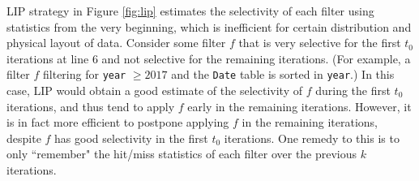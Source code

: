 \documentclass[10pt]{article}
\begin{document}

LIP strategy in Figure \ref{fig:lip} estimates the selectivity of each filter using statistics from the very beginning, which is inefficient for certain distribution and physical layout of data. Consider some filter $f$ that is very selective for the first $t_0$ iterations at line 6 and not selective for the remaining iterations. (For example, a filter $f$ filtering for \texttt{year} $\geq 2017$ and the \texttt{Date} table is sorted in \texttt{year}.) In this case, LIP would obtain a good estimate of the selectivity of $f$ during the first $t_0$ iterations, and thus tend to apply $f$ early in the remaining iterations. However, it is in fact more efficient to postpone applying $f$ in the remaining iterations, despite $f$ has good selectivity in the first $t_0$ iterations. One remedy to this is to only ``remember" the hit/miss statistics of each filter over the previous $k$ iterations.
\end{document}
